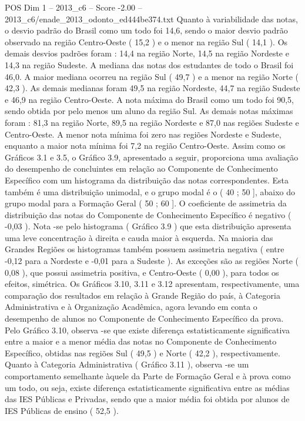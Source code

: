 \begin{textsample}{POS Dim 1 – 2013\_c6 – Score -2.00 – 2013\_c6/enade\_2013\_odonto\_ed444be374.txt}
Quanto à variabilidade das notas, o desvio padrão do Brasil como um todo foi 14,6, sendo o maior desvio padrão observado na região Centro-Oeste ( 15,2 ) e o menor na região Sul ( 14,1 ).
Os demais desvios padrões foram : 14,4 na região Norte, 14,5 na região Nordeste e 14,3 na região Sudeste.
A mediana das notas dos estudantes de todo o Brasil foi 46,0.
A maior mediana ocorreu na região Sul ( 49,7 ) e a menor na região Norte ( 42,3 ).
As demais medianas foram 49,5 na região Nordeste, 44,7 na região Sudeste e 46,9 na região Centro-Oeste.
A nota máxima do Brasil como um todo foi 90,5, sendo obtida por pelo menos um aluno da região Sul.
As demais notas máximas foram : 81,3 na região Norte, 89,5 na região Nordeste e 87,0 nas regiões Sudeste e Centro-Oeste.
A menor nota mínima foi zero nas regiões Nordeste e Sudeste, enquanto a maior nota mínima foi 7,2 na região Centro-Oeste.
Assim como os Gráficos 3.1 e 3.5, o Gráfico 3.9, apresentado a seguir, proporciona uma avaliação do desempenho de concluintes em relação ao Componente de Conhecimento Específico com um histograma da distribuição das notas correspondentes.
Esta também é uma distribuição unimodal, e o grupo modal é o ( 40 ; 50 ], abaixo do grupo modal para a Formação Geral ( 50 ; 60 ].
O coeficiente de assimetria da distribuição das notas do Componente de Conhecimento Específico é negativo ( -0,03 ).
Nota -se pelo histograma ( Gráfico 3.9 ) que esta distribuição apresenta uma leve concentração à direita e cauda maior à esquerda.
Na maioria das Grandes Regiões os histogramas também possuem assimetria negativa ( entre -0,12 para a Nordeste e -0,01 para a Sudeste ).
As exceções são as regiões Norte ( 0,08 ), que possui assimetria positiva, e Centro-Oeste ( 0,00 ), para todos os efeitos, simétrica.
Os Gráficos 3.10, 3.11 e 3.12 apresentam, respectivamente, uma comparação dos resultados em relação à Grande Região do país, à Categoria Administrativa e à Organização Acadêmica, agora levando em conta o desempenho de alunos no Componente de Conhecimento Específico da prova.
Pelo Gráfico 3.10, observa -se que existe diferença estatisticamente significativa entre a maior e a menor média das notas no Componente de Conhecimento Específico, obtidas nas regiões Sul ( 49,5 ) e Norte ( 42,2 ), respectivamente.
Quanto à Categoria Administrativa ( Gráfico 3.11 ), observa -se um comportamento semelhante àquele da Parte de Formação Geral e à prova como um todo, ou seja, existe diferença estatisticamente significativa entre as médias das IES Públicas e Privadas, sendo que a maior média foi obtida por alunos de IES Públicas de ensino ( 52,5 ).

\end{textsample}
